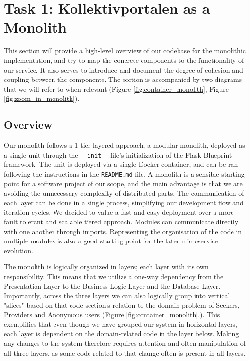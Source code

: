 \newpage
\section{Task 1: Kollektivportalen as a Monolith}


This section will provide a high-level overview of our codebase for the monolithic implementation, and try to map the concrete components to the functionality of our service. 
It also serves to introduce and document the degree of cohesion and coupling between the components. The section is accompanied by two diagrams that we will refer to when relevant (Figure \ref{fig:container_monolith}, Figure \ref{fig:zoom_in_monolith}).

\subsection{Overview}

Our monolith follows a 1-tier layered approach, a modular monolith, deployed as a single unit through the \verb|__init__| file's initialization of the Flask Blueprint framework. The unit is deployed via a single Docker container, and can be ran following the instructions in the \verb|README.md| file. 
A monolith is a sensible starting point for a software project of our scope, and the main advantage is that we are avoiding the unnecessary complexity of distributed parts. The communication of each layer can be done in a single process, simplifying our development flow and iteration cycles. 
We decided to value a fast and easy deployment over a more fault tolerant and scalable tiered approach. Modules can communicate directly with one another through imports. Representing the organisation of the code in multiple modules is also a good starting point for the later microservice evolution. 

The monolith is logically organized in layers; each layer with its own responsibility. This means that we utilize a one-way dependency from the Presentation Layer to the Business Logic Layer and the Database Layer.
Importantly, across the three layers we can also logically group into vertical "slices" based on that code section's relation to the domain problem of Seekers, Providers and Anonymous users (Figure \ref{fig:container_monolith}.).
This exemplifies that even though we have grouped our system in horizontal layers, each layer is dependent on the domain-related code in the layer below. Making any changes to the system therefore requires attention and often manipulation of all three layers, as some code related to that change often is present in all layers. 

